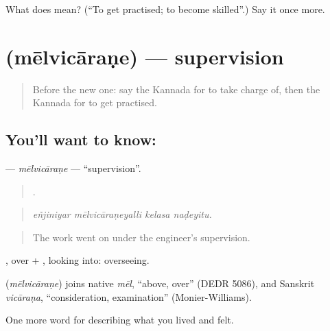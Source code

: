 \begin{tcolorbox}[breakable,colback=teal!4,colframe=teal!35!black,title={Before you move on}]
What does  mean? (\textquotedblleft{}To get practised; to become skilled\textquotedblright{}.) Say it once more.
\end{tcolorbox}
\section[\texorpdfstring{\kn{ಮೇಲ್ವಿಚಾರಣೆ} (mēlvicāraṇe)}{ಮೇಲ್ವಿಚಾರಣೆ (mēlvicāraṇe)}]{ (mēlvicāraṇe) — supervision}

\label{lesson:KA-C520-melvicarane}



\begin{quote}
Before the new one: say the Kannada for to take charge of, then the Kannada for to get practised.
\end{quote}

\subsection*{You'll want to know: }
\textbf{} — \emph{mēlvicāraṇe} — \textquotedblleft{}supervision\textquotedblright{}.

\begin{quote}
   .
\end{quote}

\begin{quote}
\emph{eñjiniyar mēlvicāraṇeyalli kelasa naḍeyitu.}
\end{quote}

\begin{quote}
The work went on under the engineer's supervision.
\end{quote}

, over + , looking into: overseeing.

\begin{cousinweb}
\textbf{} (\emph{mēlvicāraṇe}) joins native \emph{mēl}, \textquotedblleft{}above, over\textquotedblright{} (DEDR 5086), and Sanskrit \emph{vicāraṇa}, \textquotedblleft{}consideration, examination\textquotedblright{} (Monier-Williams).
\end{cousinweb}

\begin{grammarlens}[title={What you've built}]
One more word for describing what you lived and felt.
\end{grammarlens}

